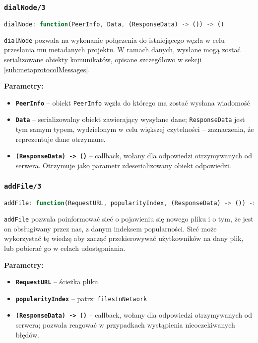 % 

\subsubsection{\texttt{dialNode/3}}
\begin{lstlisting}[language=javascript]
    dialNode: function(PeerInfo, Data, (ResponseData) -> ()) -> ()
\end{lstlisting}
\texttt{dialNode} pozwala na wykonanie połączenia do istniejącego węzła w celu przesłania mu metadanych projektu. W ramach danych, wysłane mogą zostać serializowane obiekty komunikatów, opisane szczegółowo w sekcji \ref{sub:metaprotocolMessages}.

\textbf{Parametry:}
\begin{itemize}
    \item \textbf{\texttt{PeerInfo}} -- obiekt \texttt{PeerInfo} węzła do którego ma zostać wysłana wiadomość
    \item \textbf{\texttt{Data}} -- serializowalny obiekt zawierający wysyłane dane; \texttt{ResponseData} jest tym samym typem, wydzielonym w celu większej czytelności -- zaznaczenia, że reprezentuje dane otrzymane.
    \item \textbf{\texttt{(ResponseData) -> ()}} -- callback, wołany dla odpowiedzi otrzymywanych od serwera. Otrzymuje jako parametr zdeserializowany obiekt odpowiedzi.
\end{itemize}

% 

\subsubsection{\texttt{addFile/3}}
\begin{lstlisting}[language=javascript]
    addFile: function(RequestURL, popularityIndex, (ResponseData) -> ()) -> ()
\end{lstlisting}
\texttt{addFile} pozwala poinformować sieć o pojawieniu się nowego pliku i o tym, że jest on obsługiwany przez nas, z danym indeksem popularności. Sieć może wykorzystać tę wiedzę aby zacząć przekierowywać użytkowników na dany plik, lub pobierać go w celach udostępniania.

\newpage
\textbf{Parametry:}
\begin{itemize}
    \item \textbf{\texttt{RequestURL}} -- ścieżka pliku
    \item \textbf{\texttt{popularityIndex}} -- patrz: \texttt{filesInNetwork}
    \item \textbf{\texttt{(ResponseData) -> ()}} -- callback, wołany dla odpowiedzi otrzymywanych od serwera; pozwala reagować w przypadkach wystąpienia nieoczekiwanych błędów.
\end{itemize}

